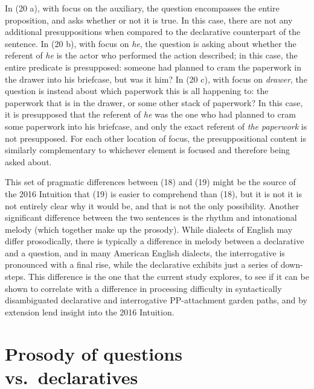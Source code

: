 \documentclass[11pt,oneside]{book}
\begin{document}
In (20 a), with focus on the auxiliary, the question encompasses the entire proposition, and asks whether or not it is true. In this case, there are not any additional presuppositions when compared to the declarative counterpart of the sentence. In (20 b), with focus on \emph{he}, the question is asking about whether the referent of \emph{he} is the actor who performed the action described; in this case, the entire predicate is presupposed: someone had planned to cram the paperwork in the drawer into his briefcase, but was it him? In (20 c), with focus on \emph{drawer}, the question is instead about which paperwork this is all happening to: the paperwork that is in the drawer, or some other stack of paperwork? In this case, it is presupposed that the referent of \emph{he} was the one who had planned to cram some paperwork into his briefcase, and only the exact referent of \emph{the paperwork} is not presupposed. For each other location of focus, the presuppositional content is similarly complementary to whichever element is focused and therefore being asked about.

This set of pragmatic differences between (18) and (19) might be the source of the 2016 Intuition that (19) is easier to comprehend than (18), but it is not it is not entirely clear why it would be, and that is not the only possibility. Another significant difference between the two sentences is the rhythm and intonational melody (which together make up the prosody). While dialects of English may differ prosodically, there is typically a difference in melody between a declarative and a question, and in many American English dialects, the interrogative is pronounced with a final rise, while the declarative exhibits just a series of down-steps. This difference is the one that the current study explores, to see if it can be shown to correlate with a difference in processing difficulty in syntactically disambiguated declarative and interrogative PP-attachment garden paths, and by extension lend insight into the 2016 Intuition.

\hypertarget{prosody-of-questions-vs.-declaratives}{%
\section{Prosody of questions vs.~declaratives}\label{prosody-of-questions-vs.-declaratives}}
\end{document}
